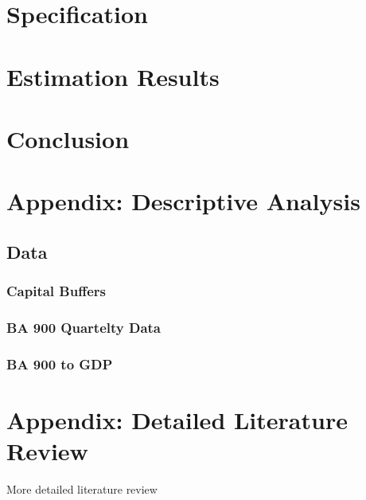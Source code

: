 \documentclass[
]{article}
\begin{document}
\hypertarget{specification}{%
\section{Specification}\label{specification}}

\hypertarget{estimation-results}{%
\section{Estimation Results}\label{estimation-results}}

\hypertarget{conclusion}{%
\section{Conclusion}\label{conclusion}}

\newpage

\hypertarget{appendix-descriptive-analysis}{%
\section{Appendix: Descriptive Analysis}\label{appendix-descriptive-analysis}}

\hypertarget{data}{%
\subsection{Data}\label{data}}

\hypertarget{capital-buffers}{%
\subsubsection{Capital Buffers}\label{capital-buffers}}

\hypertarget{ba-900-quartelty-data}{%
\subsubsection{BA 900 Quartelty Data}\label{ba-900-quartelty-data}}

\hypertarget{ba-900-to-gdp}{%
\subsubsection{BA 900 to GDP}\label{ba-900-to-gdp}}

\newpage

\hypertarget{appendix-detailed-literature-review}{%
\section{Appendix: Detailed Literature Review}\label{appendix-detailed-literature-review}}

More detailed literature review

\newpage

\renewcommand\refname{References}
  
\end{document}
